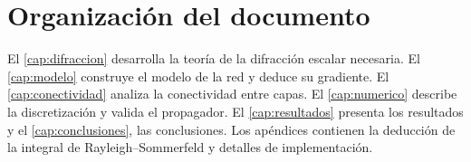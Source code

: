 \section{Organización del documento}

El \cref{cap:difraccion} desarrolla la teoría de la difracción escalar necesaria. El
\cref{cap:modelo} construye el modelo de la red y deduce su gradiente. El
\cref{cap:conectividad} analiza la conectividad entre capas. El \cref{cap:numerico} describe
la discretización y valida el propagador. El \cref{cap:resultados} presenta los resultados y
el \cref{cap:conclusiones}, las conclusiones. Los apéndices contienen la deducción de la
integral de Rayleigh--Sommerfeld y detalles de implementación.
